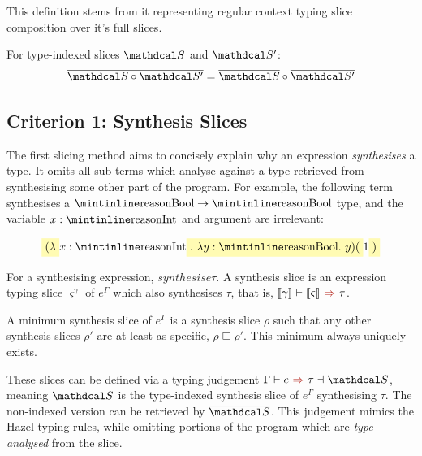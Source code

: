 This definition stems from it representing regular context typing slice composition over it's full slices.
\begin{proposition}
For type-indexed slices $\S$ and $\S'$: 
\[\overline{\S \circ \S'} = \overline{\S} \circ \overline{\S'}\]
\end{proposition}


\subsection{Criterion 1: Synthesis Slices}
\label{sec:SynthesisSlices}

The first slicing method aims to concisely explain why an expression \textit{synthesises} a type. It omits all  sub-terms which analyse against a type retrieved from synthesising some other part of the program. For example, the following term synthesises a $\code{Bool} \to \code{Bool}$ type, and the variable $x : \code{Int}$ and argument are irrelevant:

\[\hlcmaths[yellow!30]{(\lambda} x: \code{Int}\hlcmaths[yellow!30]{.\ \lambda y : \code{Bool}.\ y)(}1\hlcmaths[yellow!30]{)}\]

\begin{definition}
For a synthesising expression, $synthesis{e}{\tau}$. A synthesis slice is an expression typing slice $\varsigma^{\gamma}$ of $e^\Gamma$ which also synthesises $\tau$, that is, $\synthesis[\type{\gamma}]{\type{\varsigma}}{\tau}$.
\end{definition}
\begin{proposition}
A minimum synthesis slice of $e^\Gamma$ is a synthesis slice $\rho$ such that any other synthesis slices $\rho'$ are at least as specific, $\rho \sqsubseteq \rho'$. This minimum always uniquely exists.
\end{proposition}

These slices can be defined via a typing judgement $\synthesisslice{e}{\tau}{\S}$, meaning $\S$ is the type-indexed synthesis slice of $e^\Gamma$ synthesising $\tau$. The non-indexed version can be retrieved by $\overline{\S}$. This judgement mimics the Hazel typing rules, while omitting portions of the program which are \textit{type analysed} from the slice.  

